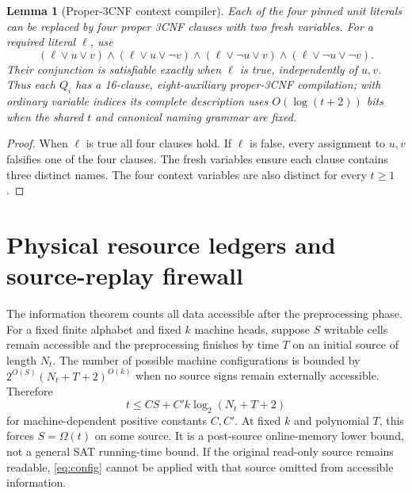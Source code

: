 \documentclass[11pt]{article}
\newtheorem{lemma}[theorem]{Lemma}
\begin{document}
\begin{lemma}[Proper-3CNF context compiler]
Each of the four pinned unit literals can be replaced by four proper 3CNF clauses with two fresh variables. For a required literal $\ell$, use
\[
 (\ell\vee u\vee v)\land(\ell\vee u\vee\neg v)\land
 (\ell\vee\neg u\vee v)\land(\ell\vee\neg u\vee\neg v).
\]
Their conjunction is satisfiable exactly when $\ell$ is true, independently of $u,v$. Thus each $Q_i$ has a 16-clause, eight-auxiliary proper-3CNF compilation; with ordinary variable indices its complete description uses $O(\log(t+2))$ bits when the shared $t$ and canonical naming grammar are fixed.
\end{lemma}
\begin{proof}
When $\ell$ is true all four clauses hold. If $\ell$ is false, every assignment to $u,v$ falsifies one of the four clauses. The fresh variables ensure each clause contains three distinct names. The four context variables are also distinct for every $t\ge1$.
\end{proof}

\section{Physical resource ledgers and source-replay firewall}
The information theorem counts all data accessible after the preprocessing phase. For a fixed finite alphabet and fixed $k$ machine heads, suppose $S$ writable cells remain accessible and the preprocessing finishes by time $T$ on an initial source of length $N_t$. The number of possible machine configurations is bounded by $2^{O(S)}(N_t+T+2)^{O(k)}$ when no source signs remain externally accessible. Therefore
\begin{equation}\label{eq:config}
\boxed{t\le C S+C'k\log_2(N_t+T+2)}
\end{equation}
for machine-dependent positive constants $C,C'$. At fixed $k$ and polynomial $T$, this forces $S=\Omega(t)$ on some source. It is a post-source online-memory lower bound, not a general SAT running-time bound. If the original read-only source remains readable, \eqref{eq:config} cannot be applied with that source omitted from accessible information.
\end{document}
